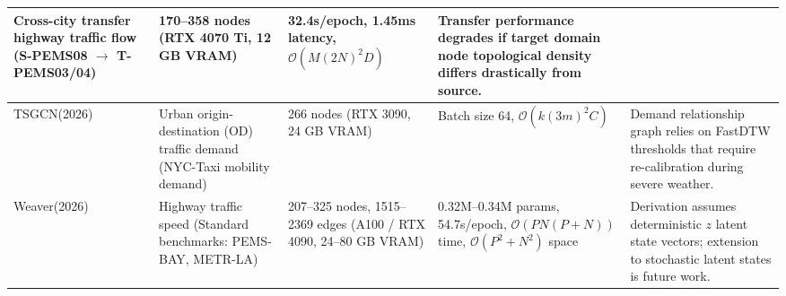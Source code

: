 \begin{longtable}{p{1.5cm} p{2.25cm} p{2.25cm} p{2.25cm} p{2.25cm}}
Cross-city transfer highway traffic flow (S-PEMS08 $\to$ T-PEMS03/04) &
170--358 nodes (RTX 4070 Ti, 12 GB VRAM) &
32.4s/epoch, 1.45ms latency, $\mathcal{O}(M(2N)^2 D)$ &
Transfer performance degrades if target domain node topological density differs drastically from source. \\
\hline
TSGCN(2026) ~\cite{jia2025trajectory} &
Urban origin-destination (OD) traffic demand (NYC-Taxi mobility demand) &
266 nodes (RTX 3090, 24 GB VRAM) &
Batch size 64, $\mathcal{O}(k(3m)^2 C)$ &
Demand relationship graph relies on FastDTW thresholds that require re-calibration during severe weather. \\
\hline
Weaver(2026) ~\cite{cheong2026weaver} &
Highway traffic speed (Standard benchmarks: PEMS-BAY, METR-LA) &
207--325 nodes, 1515--2369 edges (A100 / RTX 4090, 24--80 GB VRAM) &
0.32M--0.34M params, 54.7s/epoch, $\mathcal{O}(P N (P+N))$ time, $\mathcal{O}(P^2+N^2)$ space &
Derivation assumes deterministic $z$ latent state vectors; extension to stochastic latent states is future work. \\
\hline
\end{longtable}
\endgroup